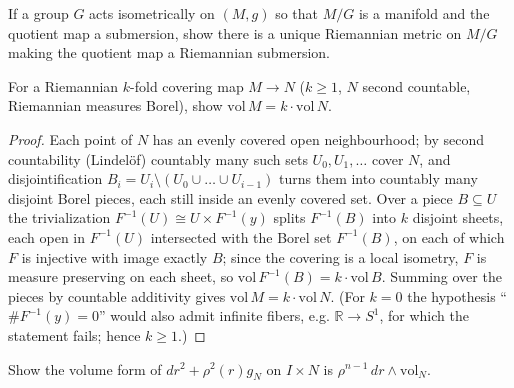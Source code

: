 \begin{remark}
  \label{rem:pet-ch1-ex-2}
  \leanok
  If a group $G$ acts isometrically on $(M,g)$ so that $M/G$ is a manifold and
  the quotient map a submersion, show there is a unique Riemannian metric on
  $M/G$ making the quotient map a Riemannian submersion.
\end{remark}

\begin{remark}
  \label{rem:pet-ch1-ex-3}
  \leanok
  For a Riemannian $k$-fold covering map $M\to N$ ($k\ge1$, $N$ second
  countable, Riemannian measures Borel), show
  $\mathrm{vol}\,M=k\cdot\mathrm{vol}\,N$.
\end{remark}
\begin{proof}
  \leanok
  Each point of $N$ has an evenly covered open neighbourhood; by second
  countability (Lindel\"of) countably many such sets $U_0,U_1,\dots$ cover
  $N$, and disjointification $B_i=U_i\setminus(U_0\cup\dots\cup U_{i-1})$
  turns them into countably many disjoint Borel pieces, each still inside an
  evenly covered set. Over a piece $B\subseteq U$ the trivialization
  $F^{-1}(U)\cong U\times F^{-1}(y)$ splits $F^{-1}(B)$ into $k$ disjoint
  sheets, each open in $F^{-1}(U)$ intersected with the Borel set
  $F^{-1}(B)$, on each of which $F$ is injective with image exactly $B$;
  since the covering is a local isometry, $F$ is measure preserving on each
  sheet, so $\mathrm{vol}\,F^{-1}(B)=k\cdot\mathrm{vol}\,B$. Summing over
  the pieces by countable additivity gives
  $\mathrm{vol}\,M=k\cdot\mathrm{vol}\,N$. (For $k=0$ the hypothesis
  ``$\#F^{-1}(y)=0$'' would also admit infinite fibers, e.g.
  $\mathbb{R}\to S^1$, for which the statement fails; hence $k\ge1$.)
\end{proof}

\begin{remark}
  \label{rem:pet-ch1-ex-4}
  \leanok
  Show the volume form of $dr^2+\rho^2(r)g_N$ on $I\times N$ is
  $\rho^{n-1}\,dr\wedge\mathrm{vol}_N$.
\end{remark}

